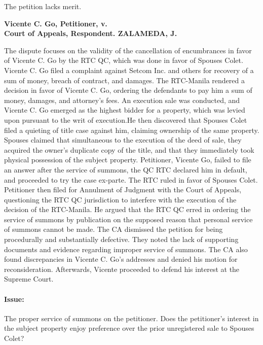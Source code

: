 \documentclass[
12pt,
oneside,
onehalfspacing,
headsepline
]{DigestCollection}
\begin{document}
The petition lacks merit.

\label{caf7cf40-0a0f-11ef-932c-63c852f65e48}


\noindent\textbf{Vicente C. Go, Petitioner, v. \\Court of Appeals, Respondent. ZALAMEDA, J.}\vspace{0.4cm}

The dispute focuses on the validity of the cancellation of encumbrances in favor of Vicente C. Go by the RTC QC, which was done in favor of Spouses Colet. Vicente C. Go filed a complaint against Setcom Inc. and others for recovery of a sum of money, breach of contract, and damages. The RTC-Manila rendered a decision in favor of Vicente C. Go, ordering the defendants to pay him a sum of money, damages, and attorney's fees. An execution sale was conducted, and Vicente C. Go emerged as the highest bidder for a property, which was levied upon pursuant to the writ of execution.He then discovered that Spouses Colet filed a quieting of title case against him, claiming ownership of the same property. Spouses claimed that simultaneous to the execution of the deed of sale, they acquired the owner's duplicate copy of the title, and that they immediately took physical possession of the subject property. Petitioner, Vicente Go, failed to file an answer after the service of summons, the QC RTC declared him in default, and proceeded to try the case ex-parte. The RTC ruled in favor of Spouses Colet. Petitioner then filed for Annulment of Judgment with the Court of Appeals, questioning the RTC QC jurisdiction to interfere with the execution of the decision of the RTC-Manila. He argued that the RTC QC erred in ordering the service of summons by publication on the supposed reason that personal service of summons cannot be made. The CA dismissed the petition for being procedurally and substantially defective. They noted the lack of supporting documents and evidence regarding improper service of summons. The CA also found discrepancies in Vicente C. Go's addresses and denied his motion for reconsideration. Afterwards, Vicente proceeded to defend his interest at the Supreme Court.

\paragraph{Issue:}
\label{90340980-09fd-11ef-932c-63c852f65e48}


The proper service of summons on the petitioner. Does the petitioner's interest in the subject property enjoy preference over the prior unregistered sale to Spouses Colet?
\end{document}
